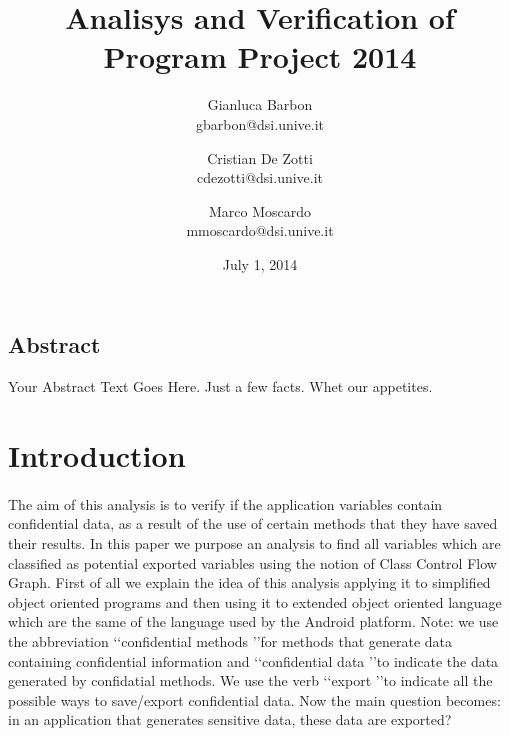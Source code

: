 \documentclass[letterpaper,twocolumn,10pt]{article}
\begin{document}
\title{\Large \bf Analisys and Verification of Program Project 2014}

\author{
{\rm Gianluca Barbon}\\
gbarbon@dsi.unive.it
\and
{\rm Cristian De Zotti}\\
cdezotti@dsi.unive.it
\and
{\rm Marco Moscardo}\\
mmoscardo@dsi.unive.it
}
\date{July 1, 2014}
\maketitle

\thispagestyle{empty}


\subsection*{Abstract}
Your Abstract Text Goes Here.  Just a few facts.
Whet our appetites.



\section{Introduction}
\paragraph{}
The aim of this analysis is to verify if the application variables contain confidential data, as a result of the use of certain methods that they have saved their results.  
In this paper we purpose an analysis to find all variables which are classified as potential exported variables using the notion of Class Control Flow Graph.
First of all we explain the idea of this analysis applying it to simplified object oriented programs and then using it to extended object oriented language which are the same of the language used by the Android platform.
Note: we use the abbreviation \lq\lq confidential methods \rq\rq for methods that generate data containing confidential information and \lq\lq confidential data \rq\rq to indicate the data generated by confidatial methods. We use the verb \lq\lq export \rq\rq to indicate all the possible ways to save/export confidential data.
Now the main question becomes: in an application that generates sensitive data, these data are exported?
\end{document}
